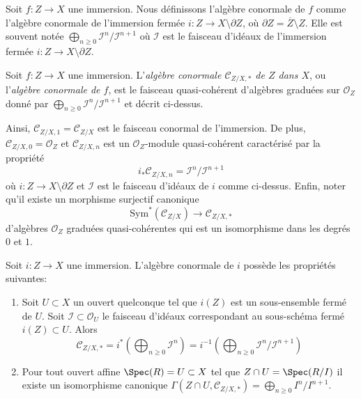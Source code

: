 \medskip\noindent
Soit  $f : Z \to X$  une immersion. Nous définissons l'algèbre conormale de
 $f$  comme l'algèbre conormale de l'immersion fermée  $i : Z \to X \setminus \partial Z$, où
 $\partial Z = \overline{Z} \setminus Z$. Elle est souvent notée  $\bigoplus_{n \geq 0} \mathcal{I}^n/\mathcal{I}^{n + 1}$  où  $\mathcal{I}$  est le faisceau
d'idéaux de l'immersion fermée  $i : Z \to X \setminus \partial Z$.

\begin{definition}
\label{definition-conormal-sheaf}
Soit $f : Z \to X$ une immersion. L'{\it algèbre
conormale $\mathcal{C}_{Z/X, *}$ de $Z$ dans $X$}, ou
l'{\it algèbre conormale de $f$}, est le faisceau quasi-cohérent d'algèbres
graduées sur $\mathcal{O}_Z$ donné par $\bigoplus_{n \geq 0} \mathcal{I}^n/\mathcal{I}^{n + 1}$ et décrit ci-dessus.
\end{definition}

\noindent
Ainsi,  $\mathcal{C}_{Z/X, 1} = \mathcal{C}_{Z/X}$  est le faisceau conormal de l'immersion. De plus,  $\mathcal{C}_{Z/X, 0} = \mathcal{O}_Z$ 
et  $\mathcal{C}_{Z/X, n}$  est un  $\mathcal{O}_Z$-module quasi-cohérent caractérisé par la
propriété
\begin{equation}
\label{equation-conormal-in-degree-n}
i_*\mathcal{C}_{Z/X, n} = \mathcal{I}^n/\mathcal{I}^{n + 1}
\end{equation}
où  $i : Z \to X \setminus \partial Z$  et  $\mathcal{I}$  est le faisceau d'idéaux de  $i$  comme
ci-dessus. Enfin, noter qu'il existe un morphisme surjectif canonique
\begin{equation}
\label{equation-conormal-algebra-quotient}
\text{Sym}^*(\mathcal{C}_{Z/X}) \longrightarrow \mathcal{C}_{Z/X, *}
\end{equation}
d'algèbres  $\mathcal{O}_Z$ graduées quasi-cohérentes qui est un isomorphisme dans les
degrés  $0$  et  $1$.

\begin{lemma}
\label{lemma-affine-conormal-sheaf}
Soit  $i : Z \to X$  une immersion. L'algèbre conormale de  $i$  possède les
propriétés suivantes:
\begin{enumerate}
\item Soit  $U \subset X$  un ouvert quelconque tel que  $i(Z)$  est un sous-ensemble
fermé de  $U$. Soit  $\mathcal{I} \subset \mathcal{O}_U$  le faisceau d'idéaux correspondant au
sous-schéma fermé  $i(Z) \subset U$. Alors
$$
\mathcal{C}_{Z/X, *} =
i^*\left(\bigoplus\nolimits_{n \geq 0} \mathcal{I}^n\right) =
i^{-1}\left(
\bigoplus\nolimits_{n \geq 0} \mathcal{I}^n/\mathcal{I}^{n + 1}
\right)
$$
\item Pour tout ouvert affine  $\Spec(R) = U \subset X$  tel que  $Z \cap U = \Spec(R/I)$  il existe un
isomorphisme canonique  $\Gamma(Z \cap U, \mathcal{C}_{Z/X, *}) = \bigoplus_{n \geq 0} I^n/I^{n + 1}$.
\end{enumerate}
\end{lemma}

